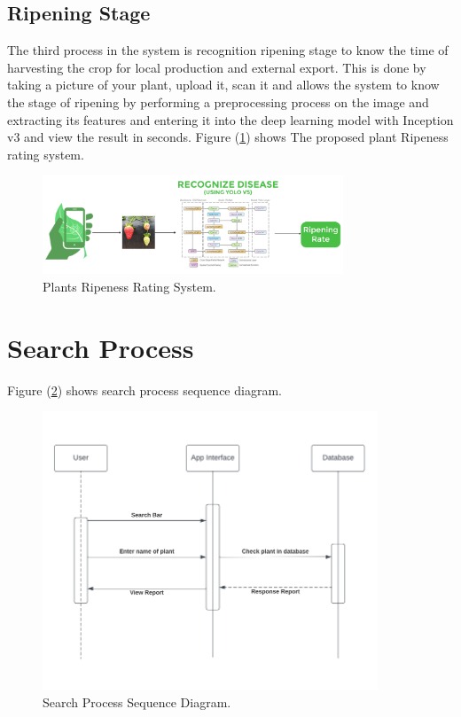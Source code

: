 \subsection{Ripening Stage}

The third process in the system is recognition ripening stage to
know the time of harvesting the crop for local production and external
export. This is done by taking a picture of your plant, upload it, scan
it and allows the system to know the stage of ripening by performing a
preprocessing process on the image and extracting its features and entering
it into the deep learning model with Inception v3 and view the result in seconds.
Figure (\ref{fig:plantRip}) shows The proposed plant Ripeness rating system.

\begin{figure}[H]
    \centering
    \includegraphics[width=0.8\textwidth]{photos/chapter04/8.png}
    \caption{Plants Ripeness Rating System.}
    \label{fig:plantRip}
\end{figure}


\section{Search Process}
Figure (\ref{fig:searchProcSec}) shows search process sequence diagram.

\begin{figure}[H]
    \centering
    \includegraphics[width=10cm]{photos/chapter04/9.png}
    \caption{Search Process Sequence Diagram.}
    \label{fig:searchProcSec}
\end{figure}

